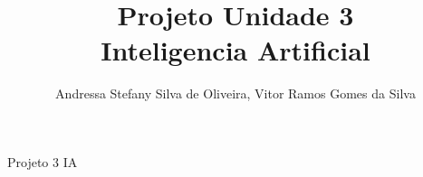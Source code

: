 \documentclass{article}
\title{Projeto Unidade 3\\Inteligencia Artificial\null\vfill}
\author{Andressa Stefany Silva de Oliveira, Vitor Ramos Gomes da Silva}
\begin{document}
	\maketitle
	\begin{titlepage}
		
	\end{titlepage}
	Projeto 3 IA
\end{document}
